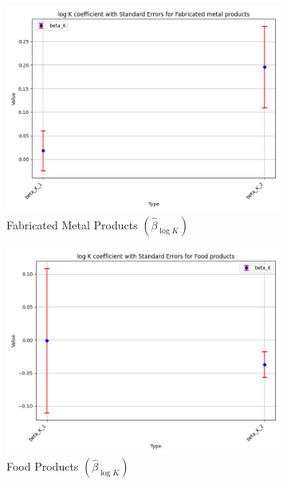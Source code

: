 \documentclass{article}
\begin{document}
\begin{figure}[ht!]
    \begin{subfigure}[t]{0.32\textwidth}
        \centering
        \includegraphics[width=\textwidth]{figure/empirical_stat_normal_kmshare_ciiu_beta_logK_with_error_bars_Fabricated metal products.png}
        \caption{Fabricated Metal Products $(\hat{\beta}_{\log K})$}
    \end{subfigure}
    \begin{subfigure}[t]{0.32\textwidth}
        \centering
        \includegraphics[width=\textwidth]{figure/empirical_stat_normal_kmshare_ciiu_beta_logK_with_error_bars_Food products.png}
        \caption{Food Products $(\hat{\beta}_{\log K})$}
    \end{subfigure}
    \begin{subfigure}[t]{0.32\textwidth}

\end{subfigure}
\end{figure}
\end{document}
